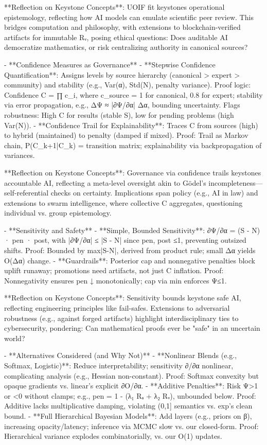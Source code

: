 **Reflection on Keystone Concepts**: UOIF fit keystones operational epistemology, reflecting how AI models can emulate scientific peer review. This bridges computation and philosophy, with extensions to blockchain-verified artifacts for immutable Rᵥ, posing ethical questions: Does auditable AI democratize mathematics, or risk centralizing authority in canonical sources?

- **Confidence Measures as Governance**
  - **Stepwise Confidence Quantification**: Assigns levels by source hierarchy (canonical > expert > community) and stability (e.g., Var(α), Std(N), penalty variance). Proof logic: Confidence C = ∏ c_i, where c_source = 1 for canonical, 0.8 for expert; stability via error propagation, e.g., ΔΨ ≈ |∂Ψ/∂α| Δα, bounding uncertainty. Flags robustness: High C for results (stable S), low for pending problems (high Var(N)).
  - **Confidence Trail for Explainability**: Traces C from sources (high) to hybrid (maintained) to penalty (damped if mixed). Proof: Trail as Markov chain, P(C_{k+1}|C_k) = transition matrix; explainability via backpropagation of variances.

**Reflection on Keystone Concepts**: Governance via confidence trails keystones accountable AI, reflecting a meta-level oversight akin to Gödel's incompleteness—self-referential checks on certainty. Implications span policy (e.g., AI in law) and extensions to swarm intelligence, where collective C aggregates, questioning individual vs. group epistemology.

- **Sensitivity and Safety**
  - **Simple, Bounded Sensitivity**: ∂Ψ/∂α = (S - N) · pen · post, with |∂Ψ/∂α| ≤ |S - N| since pen, post ≤1, preventing outsized shifts. Proof: Bounded by max|S-N|, derived from product rule; small Δα yields O(Δα) change.
  - **Guardrails**: Posterior cap and nonnegative penalties block uplift runaway; promotions need artifacts, not just C inflation. Proof: Nonnegativity ensures pen ↓ monotonically; cap via min{} enforces Ψ≤1.

**Reflection on Keystone Concepts**: Sensitivity bounds keystone safe AI, reflecting engineering principles like fail-safes. Extensions to adversarial robustness (e.g., against forged artifacts) highlight interdisciplinary ties to cybersecurity, pondering: Can mathematical proofs ever be "safe" in an uncertain world?

- **Alternatives Considered (and Why Not)**
  - **Nonlinear Blends (e.g., Softmax, Logistic)**: Reduce interpretability; sensitivity ∂/∂α nonlinear, complicating analysis (e.g., Hessian non-constant). Proof: Softmax convexity but opaque gradients vs. linear's explicit ∂O/∂α.
  - **Additive Penalties**: Risk Ψ>1 or <0 without clamps; e.g., pen = 1 - (λ₁ Rₐ + λ₂ Rᵥ), unbounded below. Proof: Additive lacks multiplicative damping, violating (0,1] semantics vs. exp's clean bound.
  - **Full Hierarchical Bayesian Models**: Add layers (e.g., priors on β), increasing opacity/latency; inference via MCMC slow vs. our closed-form. Proof: Hierarchical variance explodes combinatorially, vs. our O(1) updates.

